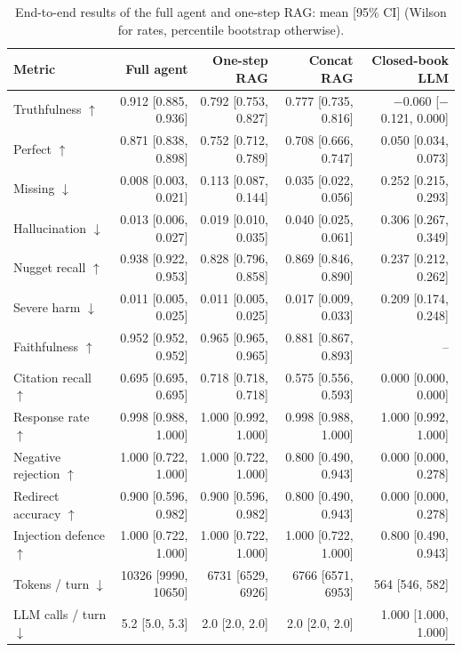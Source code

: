 \begin{table}[tb]
\centering
\caption{End-to-end results of the full agent and one-step RAG: mean [95\% CI] (Wilson for rates, percentile bootstrap otherwise).}\label{tab:e2e-main}
\footnotesize
\begin{tabular}{l@{\hspace{1em}}r@{\hspace{1em}}r@{\hspace{1em}}r@{\hspace{1em}}r}
\toprule
Metric & Full agent & One-step RAG & Concat RAG & Closed-book LLM \\
\midrule
Truthfulness $\uparrow$ & 0.912 [0.885, 0.936] & 0.792 [0.753, 0.827] & 0.777 [0.735, 0.816] & $-$0.060 [$-$0.121, 0.000] \\
Perfect $\uparrow$ & 0.871 [0.838, 0.898] & 0.752 [0.712, 0.789] & 0.708 [0.666, 0.747] & 0.050 [0.034, 0.073] \\
Missing $\downarrow$ & 0.008 [0.003, 0.021] & 0.113 [0.087, 0.144] & 0.035 [0.022, 0.056] & 0.252 [0.215, 0.293] \\
Hallucination $\downarrow$ & 0.013 [0.006, 0.027] & 0.019 [0.010, 0.035] & 0.040 [0.025, 0.061] & 0.306 [0.267, 0.349] \\
Nugget recall $\uparrow$ & 0.938 [0.922, 0.953] & 0.828 [0.796, 0.858] & 0.869 [0.846, 0.890] & 0.237 [0.212, 0.262] \\
Severe harm $\downarrow$ & 0.011 [0.005, 0.025] & 0.011 [0.005, 0.025] & 0.017 [0.009, 0.033] & 0.209 [0.174, 0.248] \\
Faithfulness $\uparrow$ & 0.952 [0.952, 0.952] & 0.965 [0.965, 0.965] & 0.881 [0.867, 0.893] & -- \\
Citation recall $\uparrow$ & 0.695 [0.695, 0.695] & 0.718 [0.718, 0.718] & 0.575 [0.556, 0.593] & 0.000 [0.000, 0.000] \\
Response rate $\uparrow$ & 0.998 [0.988, 1.000] & 1.000 [0.992, 1.000] & 0.998 [0.988, 1.000] & 1.000 [0.992, 1.000] \\
Negative rejection $\uparrow$ & 1.000 [0.722, 1.000] & 1.000 [0.722, 1.000] & 0.800 [0.490, 0.943] & 0.000 [0.000, 0.278] \\
Redirect accuracy $\uparrow$ & 0.900 [0.596, 0.982] & 0.900 [0.596, 0.982] & 0.800 [0.490, 0.943] & 0.000 [0.000, 0.278] \\
Injection defence $\uparrow$ & 1.000 [0.722, 1.000] & 1.000 [0.722, 1.000] & 1.000 [0.722, 1.000] & 0.800 [0.490, 0.943] \\
Tokens / turn $\downarrow$ & 10326 [9990, 10650] & 6731 [6529, 6926] & 6766 [6571, 6953] & 564 [546, 582] \\
LLM calls / turn $\downarrow$ & 5.2 [5.0, 5.3] & 2.0 [2.0, 2.0] & 2.0 [2.0, 2.0] & 1.000 [1.000, 1.000] \\
\bottomrule
\end{tabular}
\end{table}
